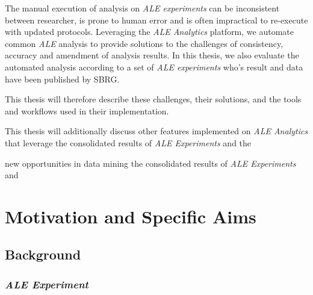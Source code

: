\documentclass[12pt,final,masters,chapterheads]{ucsd}  %
\begin{document}
The manual execution of analysis on \textit{ALE experiments} can be inconsistent between researcher, is prone to human error and is often impractical to re-execute with updated protocols. Leveraging the \textit{ALE Analytics} platform, we automate common \textit{ALE} analysis to provide solutions to the challenges of consistency, accuracy and amendment of analysis results. In this thesis, we also evaluate the automated analysis according to a set of \textit{ALE experiments} who's result and data have been published by SBRG.

This thesis will therefore describe these challenges, their solutions, and the tools and workflows used in their implementation.

This thesis will additionally discuss  other features implemented on \textit{ALE Analytics} that leverage the consolidated results of \textit{ALE Experiments} and the 

new opportunities in data mining the consolidated results of \textit{ALE Experiments} and 


\chapter{Motivation and Specific Aims}

%
%
%
%

%
%

%
%

\section{Background}
\subsection{\textit{ALE Experiment}}
\end{document}
